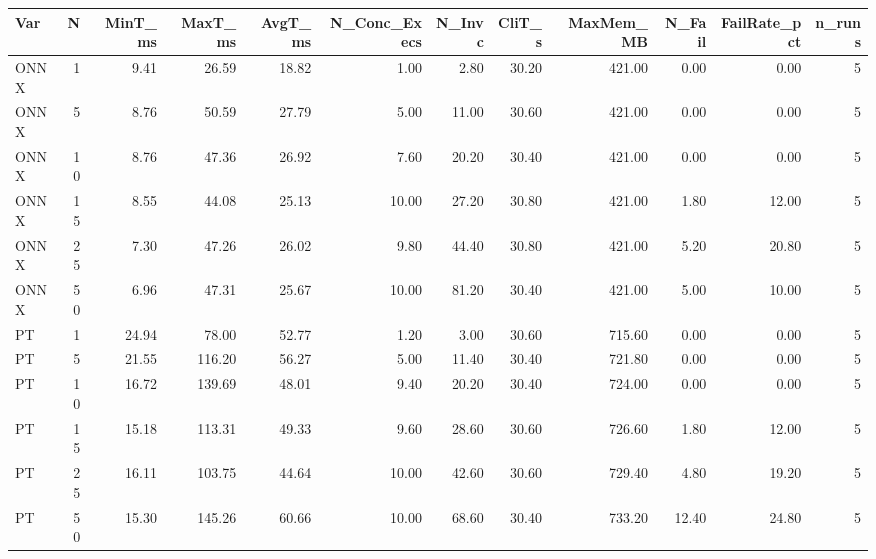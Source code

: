 \begin{tabular}{lrrrrrrrrrrr}
\toprule
Var & N & MinT\_ms & MaxT\_ms & AvgT\_ms & N\_Conc\_Execs & N\_Invc & CliT\_s & MaxMem\_MB & N\_Fail & FailRate\_pct & n\_runs \\
\midrule
ONNX & 1 & 9.41 & 26.59 & 18.82 & 1.00 & 2.80 & 30.20 & 421.00 & 0.00 & 0.00 & 5 \\
ONNX & 5 & 8.76 & 50.59 & 27.79 & 5.00 & 11.00 & 30.60 & 421.00 & 0.00 & 0.00 & 5 \\
ONNX & 10 & 8.76 & 47.36 & 26.92 & 7.60 & 20.20 & 30.40 & 421.00 & 0.00 & 0.00 & 5 \\
ONNX & 15 & 8.55 & 44.08 & 25.13 & 10.00 & 27.20 & 30.80 & 421.00 & 1.80 & 12.00 & 5 \\
ONNX & 25 & 7.30 & 47.26 & 26.02 & 9.80 & 44.40 & 30.80 & 421.00 & 5.20 & 20.80 & 5 \\
ONNX & 50 & 6.96 & 47.31 & 25.67 & 10.00 & 81.20 & 30.40 & 421.00 & 5.00 & 10.00 & 5 \\
PT & 1 & 24.94 & 78.00 & 52.77 & 1.20 & 3.00 & 30.60 & 715.60 & 0.00 & 0.00 & 5 \\
PT & 5 & 21.55 & 116.20 & 56.27 & 5.00 & 11.40 & 30.40 & 721.80 & 0.00 & 0.00 & 5 \\
PT & 10 & 16.72 & 139.69 & 48.01 & 9.40 & 20.20 & 30.40 & 724.00 & 0.00 & 0.00 & 5 \\
PT & 15 & 15.18 & 113.31 & 49.33 & 9.60 & 28.60 & 30.60 & 726.60 & 1.80 & 12.00 & 5 \\
PT & 25 & 16.11 & 103.75 & 44.64 & 10.00 & 42.60 & 30.60 & 729.40 & 4.80 & 19.20 & 5 \\
PT & 50 & 15.30 & 145.26 & 60.66 & 10.00 & 68.60 & 30.40 & 733.20 & 12.40 & 24.80 & 5 \\
\bottomrule
\end{tabular}
